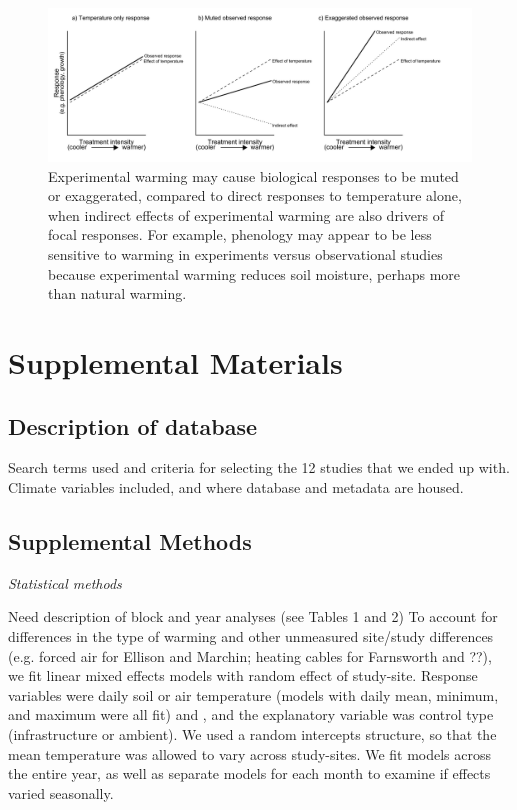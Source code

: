 \documentclass{article}
\begin{document}
 \begin{figure}[h]
     \centering
 \includegraphics{../figures/DirIndWarmingEffects.pdf}    
 \caption{Experimental warming may cause biological responses to be muted or exaggerated, compared to direct responses to temperature alone, when indirect effects of experimental warming are also drivers of focal responses. For example, phenology may appear to be less sensitive to warming in experiments versus observational studies \citep{wolkovich2012} because experimental warming reduces soil moisture, perhaps more than natural warming.} 
 \end{figure}
\clearpage
\section*{Supplemental Materials}
\subsection*{Description of database}
Search terms used and criteria for selecting the 12 studies that we ended up with. Climate variables included, and where database and metadata are housed.
\subsection*{Supplemental Methods}
\par\textit{Statistical methods}
\par Need description of block and year analyses (see Tables 1 and 2) 
To account for differences in the type of warming and other unmeasured site/study differences (e.g. forced air for Ellison and Marchin; heating cables for Farnsworth and ??), we fit linear mixed effects models with random effect of study-site. Response variables were daily soil or air temperature (models with daily  mean, minimum, and maximum were all fit) and , and the explanatory variable was control type (infrastructure or ambient). We used a random intercepts structure, so that the mean temperature was allowed to vary across study-sites. We fit models across the entire year, as well as separate models for each month to examine if effects varied seasonally.
\end{document}
